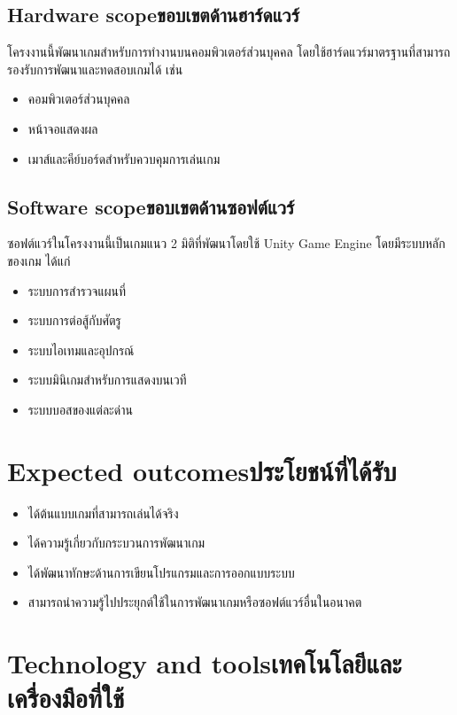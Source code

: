 \subsection{\ifenglish Hardware scope\else ขอบเขตด้านฮาร์ดแวร์\fi}

โครงงานนี้พัฒนาเกมสำหรับการทำงานบนคอมพิวเตอร์ส่วนบุคคล โดยใช้ฮาร์ดแวร์มาตรฐานที่สามารถรองรับการพัฒนาและทดสอบเกมได้ เช่น

\begin{itemize}
    \item คอมพิวเตอร์ส่วนบุคคล
    \item หน้าจอแสดงผล 
    \item เมาส์และคีย์บอร์ดสำหรับควบคุมการเล่นเกม
\end{itemize}

\subsection{\ifenglish Software scope\else ขอบเขตด้านซอฟต์แวร์\fi}

ซอฟต์แวร์ในโครงงานนี้เป็นเกมแนว 2 มิติที่พัฒนาโดยใช้ Unity Game Engine โดยมีระบบหลักของเกม ได้แก่
\begin{itemize}
    \item ระบบการสำรวจแผนที่
    \item ระบบการต่อสู้กับศัตรู
    \item ระบบไอเทมและอุปกรณ์
    \item ระบบมินิเกมสำหรับการแสดงบนเวที
    \item ระบบบอสของแต่ละด่าน
\end{itemize}

\section{\ifenglish Expected outcomes\else ประโยชน์ที่ได้รับ\fi}

\begin{itemize}
    \item ได้ต้นแบบเกมที่สามารถเล่นได้จริง
    \item ได้ความรู้เกี่ยวกับกระบวนการพัฒนาเกม
    \item ได้พัฒนาทักษะด้านการเขียนโปรแกรมและการออกแบบระบบ
    \item สามารถนำความรู้ไปประยุกต์ใช้ในการพัฒนาเกมหรือซอฟต์แวร์อื่นในอนาคต
\end{itemize}

\section{\ifenglish Technology and tools\else เทคโนโลยีและเครื่องมือที่ใช้\fi}

